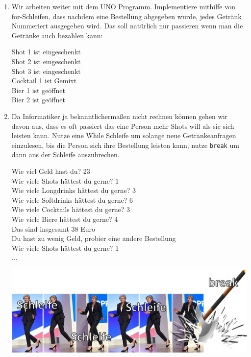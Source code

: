 \documentclass{../../sheet}
\begin{document}
\newpage
{}
\begin{enumerate}
    \item Wir arbeiten weiter mit dem UNO Programm. Implementiere mithilfe von for-Schleifen, dass nachdem eine Bestellung abgegeben wurde, jedes Getränk Nummeriert ausgegeben wird. Das soll natürlich nur passieren wenn man die Getränke auch bezahlen kann:
          \begin{ausgabe}
              Shot 1 ist  eingeschenkt\\
              Shot 2 ist  eingeschenkt\\
              Shot 3 ist  eingeschenkt\\
              Cocktail 1 ist  Gemixt\\
              Bier 1 ist geöffnet\\
              Bier 2 ist geöffnet
          \end{ausgabe}
    \item Da Informatiker ja bekanntlichermaßen nicht rechnen können gehen wir davon aus, dass es oft passiert das eine Person mehr Shots will als sie sich leisten kann. Nutze eine While Schleife um solange neue Getränkeanfragen einzulesen, bis die Person sich ihre Bestellung leisten kann, nutze \texttt{break} um dann aus der Schleife auszubrechen.
    \begin{ausgabe}
        Wie viel Geld hast du? 23\\
        Wie viele Shots hättest du gerne? 1\\
        Wie viele Longdrinks hättest du gerne? 3\\
        Wie viele Softdrinks hättest du gerne? 6\\
        Wie viele Cocktails hättest du gerne? 3\\
        Wie viele Biere hättest du gerne? 4\\
        Das sind insgesamt 38 Euro\\
        Du hast zu wenig Geld, probier eine andere Bestellung\\
        Wie viele Shots hättest du gerne? 1\\
        ...
    \end{ausgabe}

    \includegraphics[width=1\linewidth]{../../memes/breakohnerand.png}
    

\end{enumerate}
\end{document}
